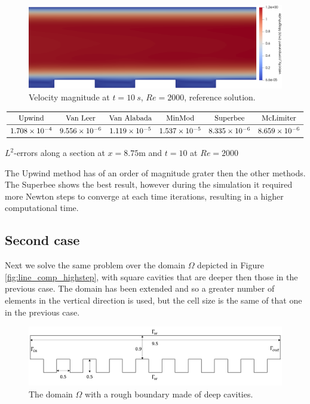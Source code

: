 \documentclass[11pt, a4paper]{article}
\theoremstyle{definition}
\begin{document}
\begin{figure}[h]
	\centering
	\includegraphics[width=\textwidth]{rough_channel_end}
	\caption{Velocity magnitude at $t=\SI{10}{s}$, $Re=2000$, reference 
	solution.}
	\label{fig:cha_end}
\end{figure}

\begin{table}[h]
	\scriptsize
	\centering
	\[
	\begin{array}{cccccc}
	\toprule
	\text{Upwind} & \text{Van Leer} & \text{Van Alabada} & \text{MinMod} & 
	\text{Superbee} & \text{McLimiter} \\ 
	\midrule
	1.708 \times 10^{-4} & 9.556 \times 10^{-6} & 1.119 \times 10^{-5} & 1.537 
	\times 10^{-5} & 8.335 \times 10^{-6} & 8.659 \times 10^{-6}\\
	\bottomrule
	\end{array}
	\]
	\caption{$L^2$-errors along a section at $x=8.75$m and $t=10$ at $Re = 
	2000$}
	\label{tab:err}
\end{table}

The Upwind method has of an order of magnitude grater then the other methods. 
The Superbee shows the best result, however during the simulation it required 
more Newton steps to converge at each time iterations, resulting in a higher 
computational time.

\FloatBarrier
\subsection{Second case}
Next we solve the same problem over the domain $\Omega$ depicted in Figure 
\ref{fig:line_comp_highstep}, with square cavities that are deeper then those 
in the previous case. The domain has been extended and so a greater number of 
elements in the vertical direction is used, but the cell size is the same of 
that one in the previous case.
\begin{figure}[h]
	\centering
	\includegraphics[width = \textwidth]{rough_domain_highstep.png}
	\caption{The domain $\Omega$ with a rough boundary made of deep cavities.}
	\label{fig:rough_domain_highstep}
\end{figure}
\end{document}

